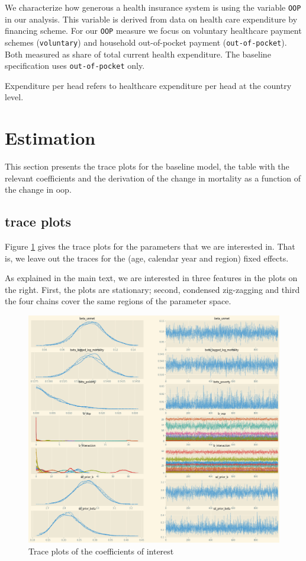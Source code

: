 \documentclass[a4paper,12pt]{article}
\begin{document}
We characterize how generous a health insurance system is using the variable \texttt{OOP} in our analysis. This variable is derived from data on health care expenditure by financing scheme. For our \texttt{OOP} measure we focus on voluntary healthcare payment schemes (\texttt{voluntary}) and household out-of-pocket payment (\texttt{out-of-pocket}). Both measured as share of total current health expenditure. The baseline specification uses \texttt{out-of-pocket} only.

Expenditure per head refers to healthcare expenditure per head at the country level.

\section{Estimation}
\label{sec:org2e606e1}

This section presents the trace plots for the baseline model, the table with the relevant coefficients and the derivation of the change in mortality as a function of the change in oop.

\subsection{trace plots}
\label{sec:orgae328ec}

Figure \ref{fig:Trace} gives the trace plots for the parameters that we are interested in. That is, we leave out the traces for the (age, calendar year and region) fixed effects.

As explained in the main text, we are interested in three features in the plots on the right. First, the plots are stationary; second, condensed zig-zagging and third the four chains cover the same regions of the parameter space.

\begin{figure}[htbp]
\centering
\includegraphics[width=.9\linewidth]{./figures/trace_plot_baseline.png}
\caption{\label{fig:Trace}Trace plots of the coefficients of interest}
\end{figure}
\end{document}
